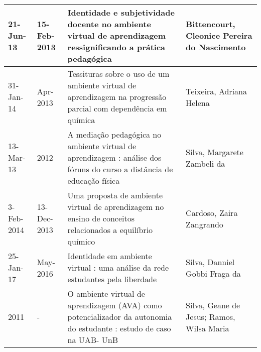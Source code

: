 \begin{table}[ht!]
{\begin{tabular}{|m{1.3cm}|m{1.3cm}|p{7cm}|p{6cm}|}
21-Jun-13   & 15-Feb-2013 & Identidade e subjetividade docente no ambiente virtual de aprendizagem ressignificando a prática pedagógica                                                                                                           & Bittencourt, Cleonice Pereira do Nascimento                                                                                                                                                                                                                  \\ \hline
31-Jan-14   & Apr-2013    & Tessituras sobre o uso de um ambiente virtual de aprendizagem na progressão parcial com dependência em química                                                                                                        & Teixeira, Adriana Helena                                                                                                                                                                                                                                     \\ \hline
13-Mar-13   & 2012        & A mediação pedagógica no ambiente virtual de aprendizagem : análise dos fóruns do curso a distância de educação física                                                                                                & Silva, Margarete Zambeli da                                                                                                                                                                                                                                  \\ \hline
3-Feb-2014  & 13-Dec-2013 & Uma proposta de ambiente virtual de aprendizagem no ensino de conceitos relacionados a equilíbrio químico                                                                                                             & Cardoso, Zaira Zangrando                                                                                                                                                                                                                                     \\ \hline
25-Jan-17   & May-2016    & Identidade em ambiente virtual : uma análise da rede estudantes pela liberdade                                                                                                                                        & Silva, Danniel Gobbi Fraga da                                                                                                                                                                                                                                \\ \hline
2011        & -           & O ambiente virtual de aprendizagem (AVA) como potencializador da autonomia do estudante : estudo de caso na UAB- UnB                                                                                                  & Silva, Geane de Jesus; Ramos, Wilsa Maria              \\ \hline
\end{tabular}}
\vspace{2mm}
\end{table}